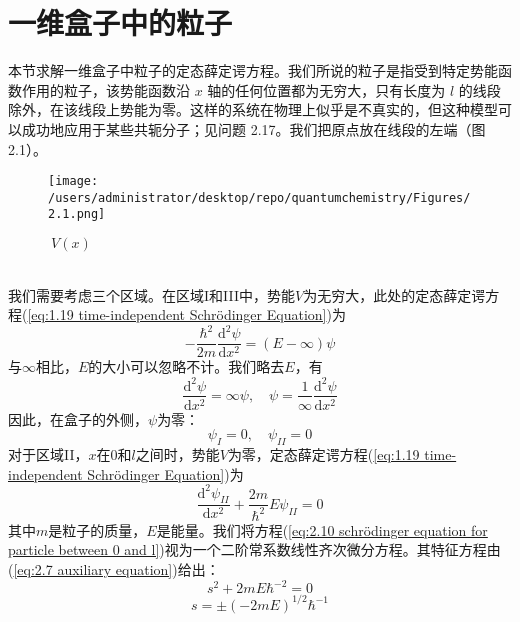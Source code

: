 \section{一维盒子中的粒子}
	本节求解一维盒子中粒子的定态薛定谔方程。我们所说的粒子是指受到特定势能函数作用的粒子，该势能函数沿 $x$ 轴的任何位置都为无穷大，只有长度为 $l$ 的线段除外，在该线段上势能为零。这样的系统在物理上似乎是不真实的，但这种模型可以成功地应用于某些共轭分子；见问题 2.17。我们把原点放在线段的左端（图 2.1）。
	\begin{figure}[h!]
		\centering
		\texttt{[image: /users/administrator/desktop/repo/quantumchemistry/Figures/2.1.png]}  %
		\caption{$\: V\left(x\right)$}
		\label{fig:2.1}
	\end{figure}
	\\
	\indent 我们需要考虑三个区域。在区域I和III中，势能$V$为无穷大，此处的定态薛定谔方程(\ref{eq:1.19 time-independent Schrödinger Equation})为
	\begin{equation*}
		-\frac{\hbar^2}{2m}\frac{\mathrm{d}^2\psi}{\mathrm{d}x^2} = \left(E - \infty\right)\psi
	\end{equation*}
	与$\infty$相比，$E$的大小可以忽略不计。我们略去$E$，有
	\begin{equation*}
		\frac{\mathrm{d}^2\psi}{\mathrm{d}x^2} = \infty \psi, \quad \psi = \frac{1}{\infty}\frac{\mathrm{d}^2\psi}{\mathrm{d}x^2}
	\end{equation*}
	因此，在盒子的外侧，$\psi$为零：
	\begin{equation}
		\psi_I=0, \quad \psi_{II} = 0
		\label{eq:2.9 psi outside the box}
	\end{equation}
	\indent 对于区域II，$x$在0和$l$之间时，势能$V$为零，定态薛定谔方程(\ref{eq:1.19 time-independent Schrödinger Equation})为
	\begin{equation}
		\frac{\mathrm{d}^2\psi_{II}}{\mathrm{d}x^2}+\frac{2m}{\hbar^2}E\psi_{II}=0
		\label{eq:2.10 schrödinger equation for particle between 0 and l}
	\end{equation}
	其中$m$是粒子的质量，$E$是能量。我们将方程(\ref{eq:2.10 schrödinger equation for particle between 0 and l})视为一个二阶常系数线性齐次微分方程。其特征方程由(\ref{eq:2.7 auxiliary equation})给出：
	\begin{equation*}
		s^2 + 2mE\hbar^{-2}=0
	\end{equation*}
	\begin{equation}
		s = \pm \left(-2mE\right)^{1/2}\hbar^{-1}
		\label{eq:2.11}
	\end{equation}
